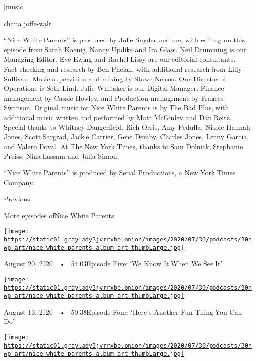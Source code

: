 {[}music{]}

chana joffe-walt

``Nice White Parents'' is produced by Julie Snyder and me, with editing
on this episode from Sarah Koenig, Nancy Updike and Ira Glass. Neil
Drumming is our Managing Editor. Eve Ewing and Rachel Lissy are our
editorial consultants. Fact-checking and research by Ben Phelan, with
additional research from Lilly Sullivan. Music supervision and mixing by
Stowe Nelson. Our Director of Operations is Seth Lind. Julie Whitaker is
our Digital Manager. Finance management by Cassie Howley, and Production
management by Frances Swanson. Original music for Nice White Parents is
by The Bad Plus, with additional music written and performed by Matt
McGinley and Dan Reitz. Special thanks to Whitney Dangerfield, Rich
Orris, Amy Pedulla, Nikole Hannah-Jones, Scott Sargrad, Jackie Carrier,
Gene Demby, Charles Jones, Lenny Garcia, and Valero Doval. At The New
York Times, thanks to Sam Dolnick, Stephanie Preiss, Nina Lassam and
Julia Simon.

``Nice White Parents'' is produced by Serial Productions, a New York
Times Company.

Previous

More episodes ofNice White Parents

\href{https://www.nytimes3xbfgragh.onion/2020/08/20/podcasts/nice-white-parents-school.html?action=click\&module=audio-series-bar\&region=header\&pgtype=Article}{\texttt{[image: https://static01.graylady3jvrrxbe.onion/images/2020/07/30/podcasts/30nwp-art/nice-white-parents-album-art-thumbLarge.jpg]}}

August 20, 2020~~•~ 54:03Episode Five: `We Know It When We See It'

\href{https://www.nytimes3xbfgragh.onion/2020/08/13/podcasts/nice-white-parents-school.html?action=click\&module=audio-series-bar\&region=header\&pgtype=Article}{\texttt{[image: https://static01.graylady3jvrrxbe.onion/images/2020/07/30/podcasts/30nwp-art/nice-white-parents-album-art-thumbLarge.jpg]}}

August 13, 2020~~•~ 50:38Episode Four: `Here's Another Fun Thing You Can
Do'

\href{https://www.nytimes3xbfgragh.onion/2020/08/06/podcasts/episode-three-this-is-our-school-how-dare-you.html?action=click\&module=audio-series-bar\&region=header\&pgtype=Article}{\texttt{[image: https://static01.graylady3jvrrxbe.onion/images/2020/07/30/podcasts/30nwp-art/nice-white-parents-album-art-thumbLarge.jpg]}}

